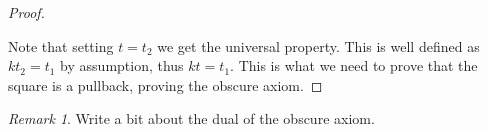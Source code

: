 \documentclass[11pt]{article}
\theoremstyle{definition}
\theoremstyle{remark}
\newtheorem*{remark}{Remark}
\begin{document}
\begin{proof}
\begin{center}
                \end{center}
                Note that setting $t=t_2$ we get the universal property. This is well defined as $kt_2=t_1$ by assumption, thus $kt=t_1$. This is what we need to prove that the square is a pullback, proving the obscure axiom.
            \end{proof}

            \begin{remark}
                Write a bit about the dual of the obscure axiom.
            \end{remark}
\end{document}

